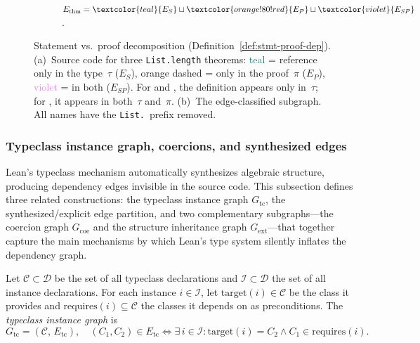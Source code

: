 \begin{figure}[!htb]
\begin{subfigure}[t]{0.44\textwidth}
\caption{$E_{\mathrm{thm}} = \textcolor{teal}{E_S} \sqcup \textcolor{orange!80!red}{E_P} \sqcup \textcolor{violet}{E_{SP}}$.}
\label{fig:sp-graph}
\end{subfigure}
\caption{Statement vs.\ proof decomposition (Definition~\ref{def:stmt-proof-dep}). (a)~Source code for three \texttt{List.length} theorems: \textcolor{teal}{teal} = reference only in the type~$\tau$ ($E_S$), \textcolor{orange!80!red}{orange dashed} = only in the proof~$\pi$ ($E_P$), \textcolor{violet}{violet} = in both ($E_{SP}$). For  and , the definition  appears only in~$\tau$; for , it appears in both~$\tau$ and~$\pi$. (b)~The edge-classified subgraph. All names have the \texttt{List.}\ prefix removed.}
\label{fig:stmt-proof-decomp}
\end{figure}

\subsubsection{Typeclass instance graph, coercions, and synthesized edges}
\label{sec:typeclass-synth}
Lean's typeclass mechanism automatically synthesizes algebraic structure, producing dependency edges invisible in the source code. This subsection defines three related constructions: the typeclass instance graph $G_{\mathrm{tc}}$, the synthesized/explicit edge partition, and two complementary subgraphs---the coercion graph $G_{\mathrm{coe}}$ and the structure inheritance graph $G_{\mathrm{ext}}$---that together capture the main mechanisms by which Lean's type system silently inflates the dependency graph.

\begin{definition}\label{def:tc-graph}
Let $\mathcal{C} \subset \mathcal{D}$ be the set of all typeclass declarations and $\mathcal{I} \subset \mathcal{D}$ the set of all instance declarations. For each instance $i \in \mathcal{I}$, let $\mathrm{target}(i) \in \mathcal{C}$ be the class it provides and $\mathrm{requires}(i) \subseteq \mathcal{C}$ the classes it depends on as preconditions. The \emph{typeclass instance graph} is
\[
  G_{\mathrm{tc}} = (\mathcal{C},\, E_{\mathrm{tc}}), \quad (C_1, C_2) \in E_{\mathrm{tc}} \iff \exists\, i \in \mathcal{I} : \mathrm{target}(i) = C_2 \land C_1 \in \mathrm{requires}(i).
\]
\end{definition}

